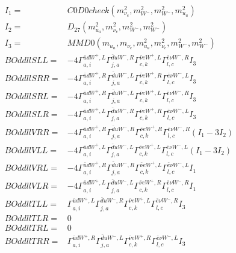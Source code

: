 \documentclass[A4,landscape]{article}
\begin{document}
\begin{align} 
I_1 = & C0D0check(m^2_{\nu_{{c}}}, m^2_{W^-}, m^2_{W^-}, m^2_{u_{{a}}}) \\ 
I_2 = & D_{27}(m^2_{u_{{a}}}, m^2_{\nu_{{c}}}, m^2_{W^-}, m^2_{W^-}) \\ 
I_3 = & MMD0(m_{u_{{a}}}, m_{\nu_{{c}}}, m^2_{u_{{a}}}, m^2_{\nu_{{c}}}, m^2_{W^-}, m^2_{W^-}) \\ 
  BOddllSLL= & -4  \Gamma^{\bar{u}d W^+,L}_{a, i} \Gamma^{\bar{d}u W^- ,R}_{j, a} \Gamma^{\bar{\nu}e W^+,L}_{c, k} \Gamma^{\bar{e}\nu W^- ,R}_{l, c} I_3 \\ 
  BOddllSRR= & -4  \Gamma^{\bar{u}d W^+,R}_{a, i} \Gamma^{\bar{d}u W^- ,L}_{j, a} \Gamma^{\bar{\nu}e W^+,R}_{c, k} \Gamma^{\bar{e}\nu W^- ,L}_{l, c} I_3 \\ 
  BOddllSRL= & -4  \Gamma^{\bar{u}d W^+,R}_{a, i} \Gamma^{\bar{d}u W^- ,L}_{j, a} \Gamma^{\bar{\nu}e W^+,L}_{c, k} \Gamma^{\bar{e}\nu W^- ,R}_{l, c} I_3 \\ 
  BOddllSLR= & -4  \Gamma^{\bar{u}d W^+,L}_{a, i} \Gamma^{\bar{d}u W^- ,R}_{j, a} \Gamma^{\bar{\nu}e W^+,R}_{c, k} \Gamma^{\bar{e}\nu W^- ,L}_{l, c} I_3 \\ 
  BOddllVRR= & -4  \Gamma^{\bar{u}d W^+,R}_{a, i} \Gamma^{\bar{d}u W^- ,R}_{j, a} \Gamma^{\bar{\nu}e W^+,R}_{c, k} \Gamma^{\bar{e}\nu W^- ,R}_{l, c} (I_1 - 3 I_2) \\ 
  BOddllVLL= & -4  \Gamma^{\bar{u}d W^+,L}_{a, i} \Gamma^{\bar{d}u W^- ,L}_{j, a} \Gamma^{\bar{\nu}e W^+,L}_{c, k} \Gamma^{\bar{e}\nu W^- ,L}_{l, c} (I_1 - 3 I_2) \\ 
  BOddllVRL= & -4  \Gamma^{\bar{u}d W^+,R}_{a, i} \Gamma^{\bar{d}u W^- ,R}_{j, a} \Gamma^{\bar{\nu}e W^+,L}_{c, k} \Gamma^{\bar{e}\nu W^- ,L}_{l, c} I_1 \\ 
  BOddllVLR= & -4  \Gamma^{\bar{u}d W^+,L}_{a, i} \Gamma^{\bar{d}u W^- ,L}_{j, a} \Gamma^{\bar{\nu}e W^+,R}_{c, k} \Gamma^{\bar{e}\nu W^- ,R}_{l, c} I_1 \\ 
  BOddllTLL= &  \Gamma^{\bar{u}d W^+,L}_{a, i} \Gamma^{\bar{d}u W^- ,R}_{j, a} \Gamma^{\bar{\nu}e W^+,L}_{c, k} \Gamma^{\bar{e}\nu W^- ,R}_{l, c} I_3 \\ 
  BOddllTLR= & 0 \\ 
  BOddllTRL= & 0 \\ 
  BOddllTRR= &  \Gamma^{\bar{u}d W^+,R}_{a, i} \Gamma^{\bar{d}u W^- ,L}_{j, a} \Gamma^{\bar{\nu}e W^+,R}_{c, k} \Gamma^{\bar{e}\nu W^- ,L}_{l, c} I_3 \\ 
\end{align} 
\end{document}
